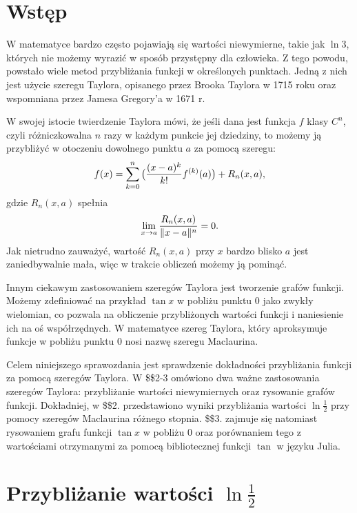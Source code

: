 \documentclass[11pt, wide, leqno]{mwart}
\begin{document}
\maketitle
\tableofcontents

\section{Wstęp}

W matematyce bardzo często pojawiają się wartości niewymierne, takie jak $\ln 3$, których nie możemy wyrazić w sposób przystępny dla człowieka. Z tego powodu, powstało wiele metod przybliżania funkcji w określonych punktach. Jedną z nich jest użycie szeregu Taylora, opisanego przez Brooka Taylora w 1715 roku oraz wspomniana przez Jamesa Gregory'a w 1671 r.
\medskip

W swojej istocie twierdzenie Taylora mówi, że jeśli dana jest funkcja $f$ klasy $C^n$, czyli różniczkowalna $n$ razy w każdym punkcie jej dziedziny, to możemy ją przybliżyć w otoczeniu dowolnego punktu $a$ za pomocą szeregu:
$$f(x)=\sum\limits_{k=0}^n\big({(x-a)^k\over k!} f^{(k)}(a)\big)+R_n(x, a),$$
gdzie $R_n(x, a)$ spełnia
$$\lim\limits_{x\to a}{R_n(x,a)\over\|x-a\|^n}=0.$$
Jak nietrudno zauważyć, wartość $R_n(x, a)$ przy $x$ bardzo blisko $a$ jest zaniedbywalnie mała, więc w trakcie obliczeń możemy ją pominąć.

Innym ciekawym zastosowaniem szeregów Taylora jest tworzenie grafów funkcji. Możemy zdefiniować na przykład $\tan x$ w pobliżu punktu $0$ jako zwykły wielomian, co pozwala na obliczenie przybliżonych wartości funkcji i naniesienie ich na oś współrzędnych. W matematyce szereg Taylora, który aproksymuje funkcje w pobliżu punktu $0$ nosi nazwę szeregu Maclaurina.

Celem niniejszego sprawozdania jest sprawdzenie dokładności przybliżania funkcji za pomocą szeregów Taylora. W \$\$2-3 omówiono dwa ważne zastosowania szeregów Taylora: przybliżanie wartości niewymiernych oraz rysowanie grafów funkcji. Dokładniej, w \$\$2. przedstawiono wyniki przybliżania wartości $\ln \frac12$ przy pomocy szeregów Maclaurina różnego stopnia. \$\$3. zajmuje się natomiast rysowaniem grafu funkcji $\tan x$ w pobliżu $0$ oraz porównaniem tego z wartościami otrzymanymi za pomocą bibliotecznej funkcji $\tan$ w języku Julia.

\section{Przybliżanie wartości $\ln\frac12$}
\end{document}
